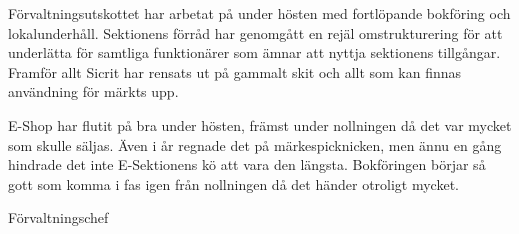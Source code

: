 \documentclass[../_main/handlingar.tex]{subfiles}
\begin{document}

Förvaltningsutskottet har arbetat på under hösten med fortlöpande bokföring och lokalunderhåll. Sektionens förråd har genomgått en rejäl omstrukturering för att underlätta för samtliga funktionärer som ämnar att nyttja sektionens tillgångar. Framför allt Sicrit har rensats ut på gammalt skit och allt som kan finnas användning för märkts upp. 

E-Shop har flutit på bra under hösten, främst under nollningen då det var mycket som skulle säljas. Även i år regnade det på märkespicknicken, men ännu en gång hindrade det inte E-Sektionens kö att vara den längsta. Bokföringen börjar så gott som komma i fas igen från nollningen då det händer otroligt mycket. 

\begin{signatures}{1}
    \mvh
    \signature{Magnus Lundh}{Förvaltningschef}
\end{signatures}
\end{document}
